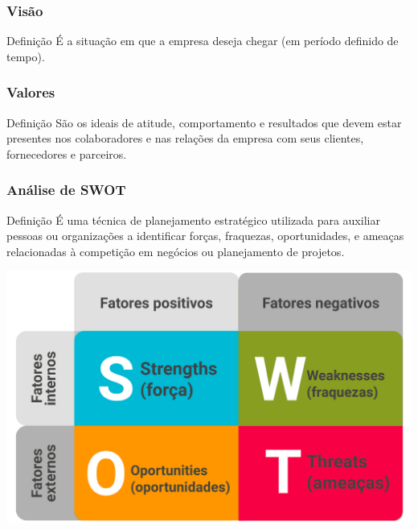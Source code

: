 \documentclass[aspectratio=169]{beamer}
\begin{document}
\begin{frame}
	\frametitle{Visão}

	\begin{block}{Defini\c cão}
		É a situação em que a empresa deseja chegar (em período definido de tempo).
	\end{block}
\end{frame}

\begin{frame}
	\frametitle{Valores}

	\begin{block}{Defini\c cão}
		São os ideais de atitude, comportamento e resultados que devem estar presentes nos colaboradores e nas relações da empresa com seus clientes, fornecedores e parceiros.
	\end{block}
\end{frame}

\begin{frame}
	\frametitle{Análise de SWOT}

	\begin{block}{Defini\c cão}
		É uma técnica de planejamento estratégico utilizada para auxiliar pessoas ou organizações a identificar forças, fraquezas, oportunidades, e ameaças relacionadas à competição em negócios ou planejamento de projetos.
	\end{block}\vfill
	
	\begin{center}
			\includegraphics[scale=0.2]{img/swot}
	\end{center}
\end{frame}
\end{document}
